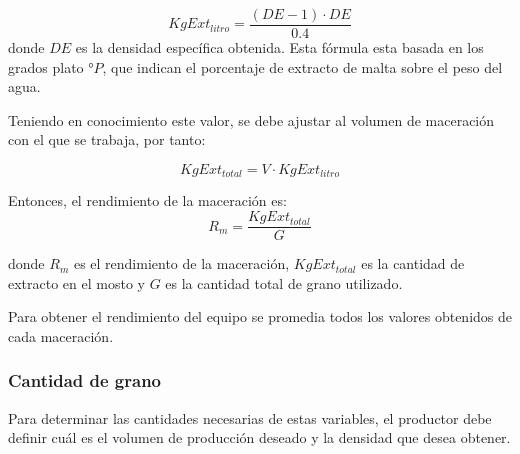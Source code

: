                     \begin{equation}
                        KgExt_{litro} = \frac{(DE-1) \cdot DE}{0.4}
                    \end{equation}
                    donde $DE$ es la densidad específica obtenida. Esta fórmula esta basada en los grados plato °$P$, que indican el porcentaje de extracto de malta sobre el peso del agua.
                    
                    \par Teniendo en conocimiento este valor, se debe ajustar al volumen de maceración con el que se trabaja, por tanto:
                    
                    \begin{equation}
                        KgExt_{total} = V \cdot KgExt_{litro}
                        \label{EcuacionExtractoTotal}
                    \end{equation}
                
                Entonces, el rendimiento de la maceración es:
                \begin{equation}
                    R_m = \frac{KgExt_{total}}{G}
                    \label{EcuacionRendimientoMaceracion}
                \end{equation}
                
                \par donde $R_m$ es el rendimiento de la maceración, $KgExt_{total}$ es la cantidad de extracto en el mosto y $G$ es la cantidad total de grano utilizado.
                
                \par Para obtener el rendimiento del equipo se promedia todos los valores obtenidos de cada maceración.
    
            
            \subsubsection{Cantidad de grano}
                \par Para determinar las cantidades necesarias de estas variables, el productor debe definir cuál es el volumen de producción deseado y la densidad que desea obtener.
                
